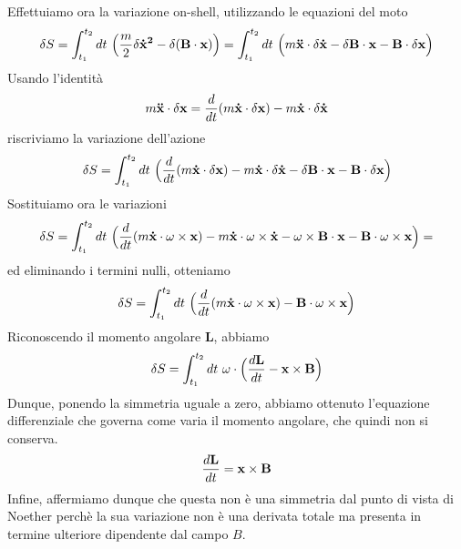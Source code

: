 \begin{example}
    Effettuiamo ora la variazione on-shell, utilizzando le equazioni del moto
\begin{equation*}
    \delta S = \int_{t_1}^{t_2}dt~ \Big( \frac{m}{2} \delta \mathbf{\dot x^2} - \delta (\mathbf B \cdot \mathbf x ) \Big ) = \int_{t_1}^{t_2}dt~ \Big( m \mathbf{\ddot x } \cdot \delta \mathbf{\dot x} - \delta \mathbf B \cdot \mathbf x - \mathbf B \cdot \delta \mathbf x \Big )
\end{equation*} 
    Usando l'identità
\begin{equation*}
    m \mathbf{\ddot x} \cdot \delta \mathbf x = \frac{d}{dt} (m \mathbf{\dot x} \cdot \delta \mathbf x) - m \mathbf{\dot x} \cdot \delta \mathbf{\dot x}
\end{equation*}
    riscriviamo la variazione dell'azione
\begin{equation*}
    \delta S = \int_{t_1}^{t_2}dt~ \Big( \frac{d}{dt} (m \mathbf{\dot x} \cdot \delta \mathbf x) - m \mathbf{\dot x} \cdot \delta \mathbf{\dot x} - \delta \mathbf B \cdot \mathbf x - \mathbf B \cdot \delta \mathbf x \Big )
\end{equation*} 
    Sostituiamo ora le variazioni
\begin{equation*}
    \delta S = \int_{t_1}^{t_2}dt~ \Big( \frac{d}{dt} (m \mathbf{\dot x} \cdot \omega \times \mathbf x) - m \mathbf{\dot x} \cdot \omega \times \mathbf{\dot x} - \omega \times \mathbf B \cdot \mathbf x - \mathbf B \cdot \omega \times \mathbf x \Big ) = 
\end{equation*} 
    ed eliminando i termini nulli, otteniamo
\begin{equation*}
    \delta S = \int_{t_1}^{t_2}dt~ \Big( \frac{d}{dt} (m \mathbf{\dot x} \cdot \omega \times \mathbf x) - \mathbf B \cdot \omega \times \mathbf x \Big )
\end{equation*} 
    Riconoscendo il momento angolare $\mathbf L$, abbiamo
\begin{equation*}
    \delta S = \int_{t_1}^{t_2}dt~ \omega \cdot \Big( \frac{d\mathbf L}{dt} - \mathbf x \times \mathbf B \Big)
\end{equation*}
    Dunque, ponendo la simmetria uguale a zero, abbiamo ottenuto l'equazione differenziale che governa come varia il momento angolare, che quindi non si conserva. 
\begin{equation*}
    \frac{d\mathbf L}{dt} = \mathbf x \times \mathbf B 
\end{equation*}
    Infine, affermiamo dunque che questa non è una simmetria dal punto di vista di Noether perchè la sua variazione non è una derivata totale ma presenta in termine ulteriore dipendente dal campo $B$.
\end{example}

